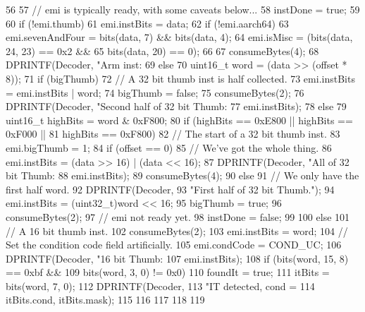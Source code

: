 \begin{DoxyCode}
56 {
57     // emi is typically ready, with some caveats below...
58     instDone = true;
59 
60     if (!emi.thumb) {
61         emi.instBits = data;
62         if (!emi.aarch64) {
63             emi.sevenAndFour = bits(data, 7) && bits(data, 4);
64             emi.isMisc = (bits(data, 24, 23) == 0x2 &&
65                           bits(data, 20) == 0);
66         }
67         consumeBytes(4);
68         DPRINTF(Decoder, "Arm inst: %
69     } else {
70         uint16_t word = (data >> (offset * 8));
71         if (bigThumb) {
72             // A 32 bit thumb inst is half collected.
73             emi.instBits = emi.instBits | word;
74             bigThumb = false;
75             consumeBytes(2);
76             DPRINTF(Decoder, "Second half of 32 bit Thumb: %
77                     emi.instBits);
78         } else {
79             uint16_t highBits = word & 0xF800;
80             if (highBits == 0xE800 || highBits == 0xF000 ||
81                     highBits == 0xF800) {
82                 // The start of a 32 bit thumb inst.
83                 emi.bigThumb = 1;
84                 if (offset == 0) {
85                     // We've got the whole thing.
86                     emi.instBits = (data >> 16) | (data << 16);
87                     DPRINTF(Decoder, "All of 32 bit Thumb: %
88                             emi.instBits);
89                     consumeBytes(4);
90                 } else {
91                     // We only have the first half word.
92                     DPRINTF(Decoder,
93                             "First half of 32 bit Thumb.\n");
94                     emi.instBits = (uint32_t)word << 16;
95                     bigThumb = true;
96                     consumeBytes(2);
97                     // emi not ready yet.
98                     instDone = false;
99                 }
100             } else {
101                 // A 16 bit thumb inst.
102                 consumeBytes(2);
103                 emi.instBits = word;
104                 // Set the condition code field artificially.
105                 emi.condCode = COND_UC;
106                 DPRINTF(Decoder, "16 bit Thumb: %
107                         emi.instBits);
108                 if (bits(word, 15, 8) == 0xbf &&
109                         bits(word, 3, 0) != 0x0) {
110                     foundIt = true;
111                     itBits = bits(word, 7, 0);
112                     DPRINTF(Decoder,
113                             "IT detected, cond = %
114                             itBits.cond, itBits.mask);
115                 }
116             }
117         }
118     }
119 }
\end{DoxyCode}
